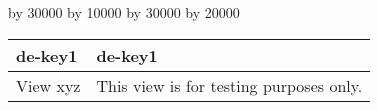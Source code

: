 
\begin{table}[htb]
\centering

\ifthenelse{\isundefined{\tabLenA}}{\newlength{\tabLenA}}{}
\ifthenelse{\isundefined{\tabLenB}}{\newlength{\tabLenB}}{}

\setlength{\tabLenA}{\textwidth}
\setlength{\tabLenB}{\textwidth}

\divide\tabLenA by 30000
\multiply\tabLenA by 10000
\divide\tabLenB by 30000
\multiply\tabLenB by 20000
\begin{tabular}{|p{\tabLenA}|p{\tabLenB}|}
\hline

de-key1
&

de-key1
\\
\hline
\hline

View xyz
&

This view is for testing purposes only.
\\
\hline
\end{tabular}
\end{table}
